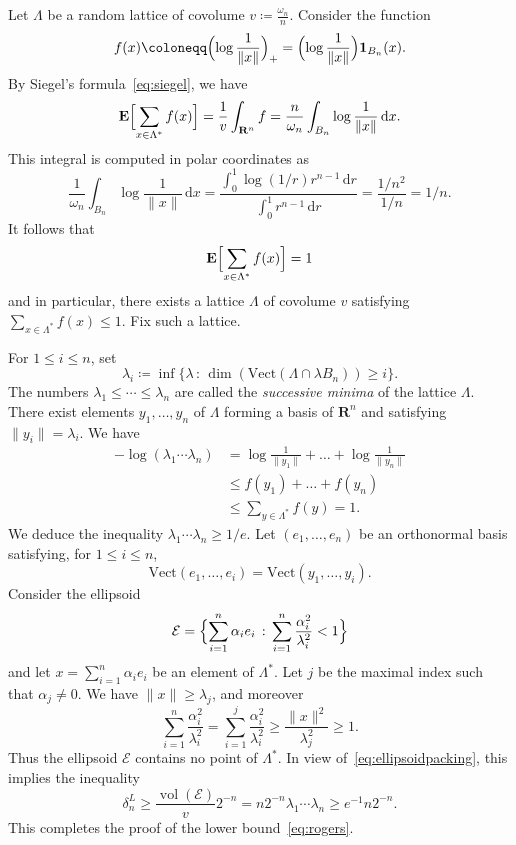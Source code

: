 \documentclass[12pt]{amsart}
\newcommand{\R}{\mathbf{R}}
\newcommand{\E}{\mathbf{E}}
\DeclareMathOperator{\vol}{vol}
\renewcommand{\leq}{\leqslant}
\renewcommand{\geq}{\geqslant}
\theoremstyle{plain}
\theoremstyle{remark}
\begin{document}
Let $\Lambda$ be a random lattice of covolume $v \coloneqq \frac{\omega_n}{n}$.
Consider the function
\[ f(x) \coloneqq \Bigl( \log \frac{1}{\|x\|} \Bigr)_+  = \Bigl( \log \frac{1}{\|x\|} \Bigr) {\bf 1}_{B_n}(x).\]
By Siegel's formula~\eqref{eq:siegel}, we have
\[ \E \Bigl[ \sum_{x \in \Lambda^*} f(x) \Bigr] = \frac 1v \int_{\R^n} f = \frac{n}{\omega_n} \int_{B_n} \log \frac{1}{\|x\|} \, \mathrm{d}x.\]
This integral is computed in polar coordinates as
\[ \frac{1}{\omega_n} \int_{B_n} \log \frac{1}{\|x\|} \, \mathrm{d}x = \frac{\int_0^1 \log(1/r)r^{n-1}\,\mathrm{d}r}{\int_0^1 r^{n-1}\,\mathrm{d}r} = \frac{1/n^2}{1/n} = 1/n.\]
It follows that
\[ \E \Bigl[ \sum_{x \in \Lambda^*} f(x) \Bigr] = 1\]
and in particular, there exists a lattice $\Lambda$ of covolume $v$ satisfying $\sum_{x \in \Lambda^*} f(x) \leq 1$. Fix such a lattice.
 
For $1 \leq i \leq n$, set
\[ \lambda_i \coloneqq  \inf \{ \lambda \, : \, \dim \left( \mathrm{Vect} ( \Lambda \cap \lambda B_n ) \right) \geq i \}. \]
The numbers $\lambda_1 \leq \cdots \leq \lambda_n$ are called the \emph{successive minima} of the lattice $\Lambda$. There exist elements $y_1,\dots,y_n$ of $\Lambda$ forming a basis of $\R^n$ and satisfying $\|y_i\|=\lambda_i$. We have
\begin{align*}
-\log (\lambda_1\cdots \lambda_n) & =  \log \frac{1}{\|y_1\|} + \dots + \log \frac{1}{\|y_n\|} \\
& \leq  f(y_1) + \dots + f(y_n) \\
& \leq  \sum_{y \in \Lambda^*} f(y) =  1.
\end{align*}
We deduce the inequality $\lambda_1 \cdots \lambda_n \geq 1/e$. Let $(e_1,\dots,e_n)$ be an orthonormal basis satisfying, for $1 \leq i \leq n$,
\[ \mathrm{Vect} (e_1,\dots,e_i) = \mathrm{Vect} (y_1,\dots,y_i) .\]
Consider the ellipsoid
\[ \mathcal{E} = \Bigl\{ \sum_{i=1}^n \alpha_i e_i \, : \, \sum_{i=1}^n \frac{\alpha_i^2}{\lambda_i^2} < 1 \Bigr\} \]
and let $x= \sum_{i=1}^n \alpha_i e_i$ be an element of $\Lambda^*$. Let $j$ be the maximal index such that $\alpha_j \neq 0$. We have $\|x\| \geq \lambda_j$, and moreover
\[ \sum_{i=1}^n \frac{\alpha_i^2}{\lambda_i^2} = \sum_{i=1}^j \frac{\alpha_i^2}{\lambda_i^2}
\geq \frac{\|x\|^2}{\lambda_j^2} \geq 1.
\]
Thus the ellipsoid $\mathcal{E}$ contains no point of $\Lambda^*$. In view of~\eqref{eq:ellipsoidpacking}, this implies the inequality
\[ \delta_n^L \geq \frac{\vol (\mathcal{E})}{v} 2^{-n}= n 2^{-n} \lambda_1 \cdots \lambda_n \geq e^{-1}n2^{-n} .\]
This completes the proof of the lower bound~\eqref{eq:rogers}.
 
\end{document}
